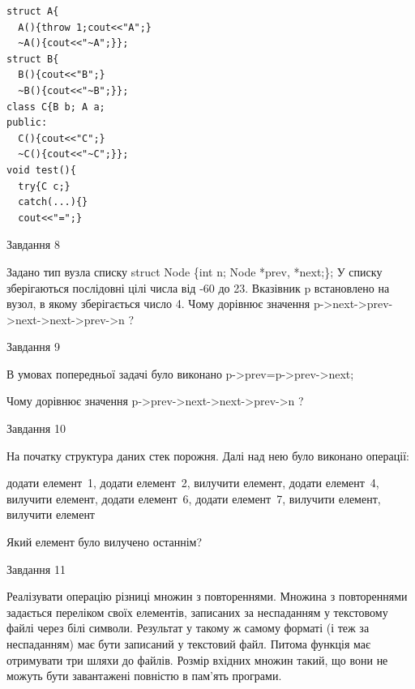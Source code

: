 \documentclass[12pt, ukrainian]{article}
\begin{document}
{{{{{{{{{{{{{{\begin{minipage}[t]{7cm}
\begin{verbatim}
struct A{
  A(){throw 1;cout<<"A";}
  ~A(){cout<<"~A";}};
struct B{
  B(){cout<<"B";}
  ~B(){cout<<"~B";}};
class C{B b; A a;
public:
  C(){cout<<"C";}
  ~C(){cout<<"~C";}};
void test(){
  try{C c;} 
  catch(...){} 
  cout<<"=";}
\end{verbatim}            


\end{minipage}
               
{\begin{center}Завдання {8}\end{center}}
\vspace{-6mm}
Задано тип вузла списку
struct Node \{int n; Node *prev, *next;\};
У списку зберігаються послідовні цілі числа від -60 до 23. Вказівник p встановлено на вузол, в якому зберігається число 4.
Чому дорівнює значення p->next->prev->next->next->prev->n ?\par

               
{\begin{center}Завдання {9}\end{center}}
\vspace{-6mm}
В умовах попередньої задачі було виконано p->prev=p->prev->next;

Чому дорівнює значення p->prev->next->next->prev->n ?\par

\newpage
               
{\begin{center}Завдання {10}\end{center}}
\vspace{-6mm}
На початку структура даних стек порожня. Далі над нею було виконано операції:

додати елемент~1, додати елемент~2, вилучити елемент, додати елемент~4, вилучити елемент, додати елемент~6, додати елемент~7, вилучити елемент, вилучити елемент

Який елемент було вилучено останнім?\par

               
{\begin{center}Завдання {11}\end{center}}
\vspace{-6mm}

Реалізувати операцію різниці множин з повтореннями. Множина з повтореннями задається переліком своїх елементів, записаних за неспаданням у текстовому файлі через білі символи. Результат у такому ж самому форматі (і теж за неспаданням) має бути записаний у текстовий файл. Питома функція має отримувати три шляхи до файлів. Розмір вхідних множин такий, що вони не можуть бути завантажені повністю в пам’ять програми.

}}}}}}}}}}}}}}
\end{document}
